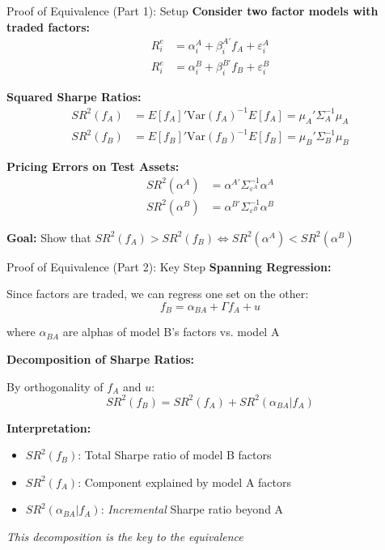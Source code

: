 \documentclass{beamer}
\begin{document}
\begin{frame}{Proof of Equivalence (Part 1): Setup}
    \textbf{Consider two factor models with traded factors:}
    \begin{align*}
        R^e_i &= \alpha_i^A + \beta_i^{A'} f_A + \varepsilon_i^A \\
        R^e_i &= \alpha_i^B + \beta_i^{B'} f_B + \varepsilon_i^B
    \end{align*}
    
    
    \textbf{Squared Sharpe Ratios:}
    \begin{align*}
        SR^2(f_A) &= E[f_A]' \text{Var}(f_A)^{-1} E[f_A] = \mu_A' \Sigma_A^{-1} \mu_A \\
        SR^2(f_B) &= E[f_B]' \text{Var}(f_B)^{-1} E[f_B] = \mu_B' \Sigma_B^{-1} \mu_B
    \end{align*}
    
    
    \textbf{Pricing Errors on Test Assets:}
    \begin{align*}
        SR^2(\alpha^A) &= \alpha^{A'} \Sigma_{\varepsilon^A}^{-1} \alpha^A \\
        SR^2(\alpha^B) &= \alpha^{B'} \Sigma_{\varepsilon^B}^{-1} \alpha^B
    \end{align*}
    
    
    \textbf{Goal:} Show that $SR^2(f_A) > SR^2(f_B) \Leftrightarrow SR^2(\alpha^A) < SR^2(\alpha^B)$
\end{frame}

\begin{frame}{Proof of Equivalence (Part 2): Key Step}
    \textbf{Spanning Regression:}
    
    Since factors are traded, we can regress one set on the other:
    \begin{equation}\label{eq:spanning}
        f_B = \alpha_{BA} + \Gamma f_A + u
    \end{equation}
    
    where $\alpha_{BA}$ are alphas of model B's factors vs. model A
    
    \vspace{0.3cm}
    \textbf{Decomposition of Sharpe Ratios:}
    
    By orthogonality of $f_A$ and $u$:
    \begin{equation}\label{eq:decomposition}
        SR^2(f_B) = SR^2(f_A) + SR^2(\alpha_{BA} | f_A)
    \end{equation}
    
    
    \textbf{Interpretation:}
    \begin{itemize}
        \item $SR^2(f_B)$: Total Sharpe ratio of model B factors
        \item $SR^2(f_A)$: Component explained by model A factors
        \item $SR^2(\alpha_{BA} | f_A)$: \textit{Incremental} Sharpe ratio beyond A
    \end{itemize}
    
    
    \textit{This decomposition is the key to the equivalence}
\end{frame}
\end{document}
